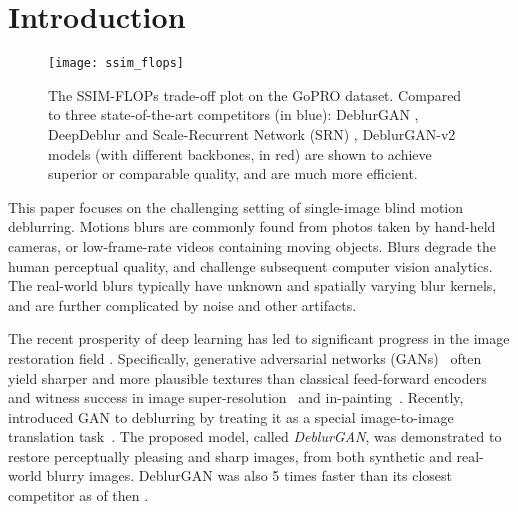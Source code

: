 \documentclass[10pt,twocolumn,letterpaper]{article}
\begin{document}
\section{Introduction}
\label{s:intro}

\newcommand{\ra}[1]{\renewcommand{\arraystretch}{#1}}
\begin{figure}[htb]\vspace{-2.2em}
\centering
  \texttt{[image: ssim\_flops]} \\
     \vspace{-1em}
   \caption{The SSIM-FLOPs trade-off plot on the GoPRO dataset. Compared to three state-of-the-art competitors (in blue): DeblurGAN \cite{kupyn2018deblurgan}, DeepDeblur \cite{Nah2016DeepDeblurring} and Scale-Recurrent Network (SRN) \cite{tao2018scale}, DeblurGAN-v2 models (with different backbones, in red) are shown to achieve superior or comparable quality, and are much more efficient.}
   \vspace{-1em}
 \label{fig:cover}
\end{figure}

This paper focuses on the challenging setting of single-image blind motion deblurring. Motions blurs are commonly found from photos taken by hand-held cameras, or low-frame-rate videos containing moving objects. Blurs degrade the human perceptual quality, and challenge subsequent computer vision analytics. The real-world blurs typically have unknown and spatially varying blur kernels, 
and are further complicated by noise and other artifacts. 







The recent prosperity of deep learning has led to significant progress in the image restoration field \cite{wang2016d3,liu2017robust}. Specifically, generative adversarial networks (GANs)~\cite{GAN} often yield sharper and more plausible textures than classical feed-forward encoders and witness success in image super-resolution~\cite{SRGAN} and in-painting~\cite{Inpainting}. Recently, \cite{kupyn2018deblurgan} introduced GAN to deblurring by treating it as a special image-to-image translation task~\cite{pix2pix}. The proposed model, called \textit{DeblurGAN}, was demonstrated to restore perceptually pleasing and sharp images, from both synthetic and real-world blurry images. DeblurGAN was also 5 times faster than its closest competitor as of then \cite{Nah2016DeepDeblurring}. 
\end{document}

